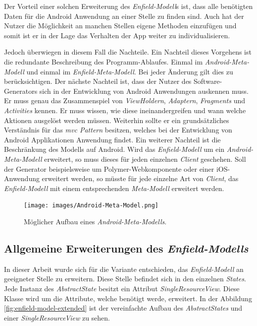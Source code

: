 \newpage

Der Vorteil einer solchen Erweiterung des \textit{Enfield-Modell}s ist, dass alle benötigten Daten für die Android Anwendung an einer Stelle zu finden sind. Auch hat der Nutzer die Möglichkeit an manchen Stellen eigene Methoden einzufügen und somit ist er in der Lage das Verhalten der App weiter zu individualisieren.

Jedoch überwiegen in diesem Fall die Nachteile. Ein Nachteil dieses Vorgehens ist die redundante Beschreibung des Programm-Ablaufes. Einmal im \textit{Android-Meta-Modell} und einmal im \textit{Enfield-Meta-Modell}. Bei jeder Änderung gilt dies zu berücksichtigen. 
Der nächste Nachteil ist, dass der Nutzer des Software-Generators sich in der Entwicklung von Android Anwendungen auskennen muss. Er muss genau das Zusammenspiel von \textit{ViewHoldern}, \textit{Adaptern}, \textit{Fragments} und \textit{Activities} kennen. Er muss wissen, wie diese ineinandergreifen und wann welche Aktionen ausgelöst werden müssen. Weiterhin sollte er ein grundsätzliches Verständnis für das \textit{\acf{mvc} Pattern} besitzen, welches bei der Entwicklung von Android Applikationen Anwendung findet.
Ein weiterer Nachteil ist die Beschränkung des Modells auf Android. Wird das \textit{Enfield-Modell} um ein \textit{Android-Meta-Modell} erweitert, so muss dieses für jeden einzelnen \textit{Client} geschehen. Soll der Generator beispielsweise um Polymer-Webkomponente oder einer iOS-Anwendung erweitert werden, so müsste für jede einzelne Art von \textit{Client}, das \textit{Enfield-Modell} mit einem entsprechenden \textit{Meta-Modell} erweitert werden.

\begin{figure}[H]
	\begin{center}
		\texttt{[image: images/Android-Meta-Model.png]}
		\caption{Möglicher Aufbau eines \textit{Android-Meta-Modells}.}
		\label{fig:android-model}
	\end{center}
\end{figure}

\subsection{Allgemeine Erweiterungen des \textit{Enfield-Modells}}\label{sec:generic_modell}

In dieser Arbeit wurde sich für die Variante entschieden, das \textit{Enfield-Modell} an geeigneter Stelle zu erweitern.
Diese Stelle befindet sich in den einzelnen \textit{States}. Jede Instanz des \textit{AbstractState} besitzt ein Attribut \textit{SingleResourceView}. Diese Klasse wird um die  Attribute, welche benötigt werde, erweitert. In der Abbildung \ref{fig:enfield-model-extended} ist der vereinfachte Aufbau des \textit{AbstractStates} und einer \textit{SingleResourceView} zu sehen.


